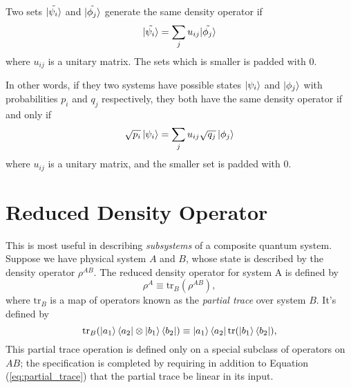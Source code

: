 \begin{theorem}
    Two sets $\Tilde{\ket{\psi_i}}$ and $\tilde{\ket{\phi_j}}$ generate the same density operator if
    \begin{equation}
        \tilde{\ket{\psi_i}} = 
        \sum_j u_{ij}\tilde{\ket{\phi_j}}
    \end{equation}
    where $u_{ij}$ is a unitary matrix. The sets which is smaller is padded with 0.
\end{theorem}

In other words, if they two systems have possible states $\ket{\psi_i}$ and $\ket{\phi_j}$ with probabilities $p_i$ and $q_j$ respectively, they both have the same density operator if and only if
\begin{equation}
    \sqrt{p_i}\ket{\psi_i} = 
    \sum_j u_{ij}\sqrt{q_j}\ket{\phi_j}
\end{equation}
where $u_{ij}$ is a unitary matrix, and the smaller set is padded with 0.

\section{Reduced Density Operator}
This is most useful in describing \textit{subsystems} of a composite quantum system. Suppose we have physical system $A$ and $B$, whose state is described by the density operator $\rho^{AB}$. The reduced density operator for system A is defined by
\begin{equation}
    \rho^A \equiv \text{tr}_B(\rho^{AB}),
\end{equation}
where $\text{tr}_B$ is a map of operators known as the \textit{partial trace} over system $B$. It's defined by
\begin{equation}
    \text{tr}_B(\ket{a_1}\bra{a_2}\otimes\ket{b_1}\bra{b_2}) \equiv \ket{a_1}\bra{a_2}\text{tr}(\ket{b_1}\bra{b_2}),
    \label{eq:partial_trace}
\end{equation}
This partial trace operation is defined only on a special subclass of operators on $AB$; the specification is completed by requiring in addition to Equation (\ref{eq:partial_trace}) that the partial trace be linear in its input.

